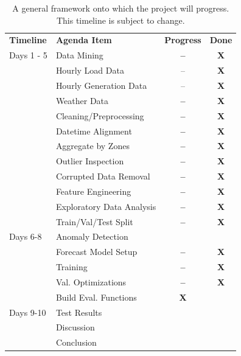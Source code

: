 \documentclass[sigconf]{acmart}
\begin{document}
\begin{table}[hbt!]
\centering
\caption{A general framework onto which the project will progress. This timeline is subject to change.}
\begin{tabular}{ll | c | c}
\toprule
\textbf{Timeline} & \textbf{Agenda Item} & \hfil \textbf{Progress} & \hfil \textbf{Done} \\
\cmidrule(rl){1-1}\cmidrule(rl){2-2}\cmidrule(rl){3-3}\cmidrule(rl){4-4}
  Days 1 - 5 & Data Mining & \textbf{--} & \textbf{X} \\
  \cmidrule(rl){1-4}
   & \hspace{3mm}Hourly Load Data & -- & \textbf{X} \\   
   & \hspace{3mm}Hourly Generation Data & -- & \textbf{X} \\   
   & \hspace{3mm}Weather Data & \textbf{--} & \textbf{X}\\   
   & Cleaning/Preprocessing & \textbf{--} & \textbf{X}\\  
   \cmidrule(rl){2-4} 
   & \hspace{3mm}Datetime Alignment & \textbf{--} & \textbf{X}\\   
   & \hspace{3mm}Aggregate by Zones & \textbf{--} & \textbf{X}\\   
   & \hspace{3mm}Outlier Inspection & \textbf{--} & \textbf{X}\\   
   & \hspace{3mm}Corrupted Data Removal & \textbf{--} & \textbf{X}\\  
   & Feature Engineering & \textbf{--} & \textbf{X}\\  
   & Exploratory Data Analysis & \textbf{--} & \textbf{X}\\  
   \cmidrule(rl){2-4} 
   & Train/Val/Test Split &\textbf{--} & \textbf{X}\\  
   \cmidrule(rl){2-4} 
  Days 6-8 & Anomaly Detection & & \\  
   \cmidrule(rl){1-4} 
   & Forecast Model Setup &\textbf{--} & \textbf{X}\\  
   \cmidrule(rl){2-4} 
   & \hspace{3mm}Training &\textbf{--} & \textbf{X} \\  
   & \hspace{3mm}Val. Optimizations &\textbf{--} & \textbf{X}\\  
   & Build Eval. Functions & \textbf{X}& \\  
   \cmidrule(rl){2-4} 
  Days 9-10 & Test Results & & \\  
  \cmidrule(rl){1-4} 
   & Discussion & & \\
   \cmidrule(rl){2-4}   
   & Conclusion & & \\  
   \cmidrule(rl){2-4} 
  \bottomrule
\end{tabular}
\end{table}
\end{document}
